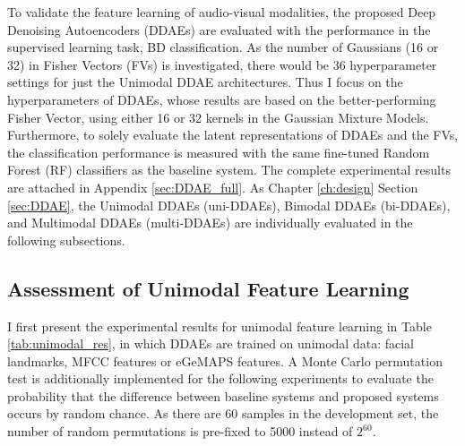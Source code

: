 To validate the feature learning of audio-visual modalities, the proposed Deep Denoising Autoencoders (DDAEs) are evaluated with the performance in the supervised learning task, BD classification. As the number of Gaussians (16 or 32) in Fisher Vectors (FVs) is investigated, there would be 36 hyperparameter settings for just the Unimodal DDAE architectures. Thus I focus on the hyperparameters of DDAEs, whose results are based on the better-performing Fisher Vector, using either 16 or 32 kernels in the Gaussian Mixture Models. Furthermore, to solely evaluate the latent representations of DDAEs and the FVs, the classification performance is measured with the same fine-tuned Random Forest (RF) classifiers as the baseline system. The complete experimental results are attached in Appendix \ref{sec:DDAE_full}. As Chapter \ref{ch:design} Section \ref{sec:DDAE}, the Unimodal DDAEs (uni-DDAEs), Bimodal DDAEs (bi-DDAEs), and Multimodal DDAEs (multi-DDAEs) are individually evaluated in the following subsections.

\subsection{Assessment of Unimodal Feature Learning}

I first present the experimental results for unimodal feature learning in Table \ref{tab:unimodal_res}, in which DDAEs are trained on unimodal data: facial landmarks, MFCC features or eGeMAPS features. A Monte Carlo permutation test is additionally implemented for the following experiments to evaluate the probability that the difference between baseline systems and proposed systems occurs by random chance. As there are 60 samples in the development set, the number of random permutations is pre-fixed to 5000 instead of $2^{60}$.


